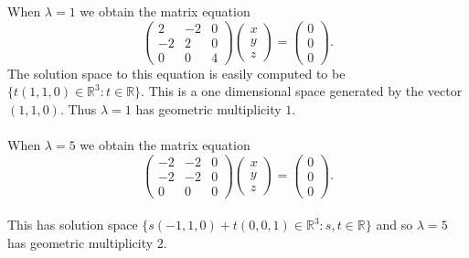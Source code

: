 \documentclass{amsart}
\begin{document}
When $\lambda=1$ we obtain the matrix equation
\begin{equation*}
 \begin{pmatrix}
 2&-2&0\\
 -2&2&0\\
 0&0&4
 \end{pmatrix}
  \begin{pmatrix}
x\\
y\\
z
 \end{pmatrix}
 =
  \begin{pmatrix}
0\\
0\\
0
 \end{pmatrix}.
\end{equation*}
The solution space to this equation is easily computed to be $\{t(1,1,0)\in\mathbb{R}^{3}:t\in\mathbb{R}\}$. This is a one dimensional space generated by the vector $(1,1,0)$. Thus $\lambda =1$ has geometric multiplicity $1$.\\
\\
When $\lambda =5$ we obtain the matrix equation
\begin{equation*}
 \begin{pmatrix}
 -2&-2&0\\
 -2&-2&0\\
 0&0&0
 \end{pmatrix}
  \begin{pmatrix}
x\\
y\\
z
 \end{pmatrix}
 =
  \begin{pmatrix}
0\\
0\\
0
 \end{pmatrix}.
\end{equation*}
\\
This has solution space $\{s(-1,1,0)+t(0,0,1)\in\mathbb{R}^{3}:s,t\in\mathbb{R}\}$ and so $\lambda=5$ has geometric multiplicity $2$.
\end{document}
